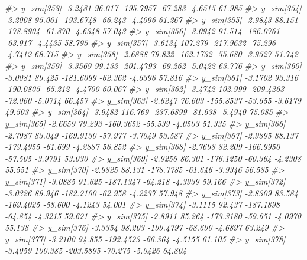 \documentclass[
  10pt,
  italian,
  a4paper,
  extrafontsizes,onecolumn,openright
  ]{memoir}
\newenvironment{Shaded}{\begin{snugshade}}{\end{snugshade}}
\newcommand{\CommentTok}[1]{\textcolor[rgb]{0.56,0.35,0.01}{\textit{#1}}}
\begin{document}
\begin{Shaded}
\begin{Highlighting}[]
\CommentTok{\#\textgreater{}   y\_sim[353] {-}3.2481  96.017 {-}195.7957 {-}67.283 {-}4.6515 61.985}
\CommentTok{\#\textgreater{}   y\_sim[354] {-}3.2008  95.061 {-}193.6748 {-}66.243 {-}4.4096 61.267}
\CommentTok{\#\textgreater{}   y\_sim[355] {-}2.9843  88.151 {-}178.8904 {-}61.870 {-}4.6348 57.043}
\CommentTok{\#\textgreater{}   y\_sim[356] {-}3.0942  91.514 {-}186.0761 {-}63.917 {-}4.4435 58.795}
\CommentTok{\#\textgreater{}   y\_sim[357] {-}3.6134 107.279 {-}217.9632 {-}75.296 {-}4.7412 68.715}
\CommentTok{\#\textgreater{}   y\_sim[358] {-}2.6888  79.822 {-}162.1732 {-}55.680 {-}3.9527 51.742}
\CommentTok{\#\textgreater{}   y\_sim[359] {-}3.3569  99.133 {-}201.4793 {-}69.262 {-}5.0422 63.776}
\CommentTok{\#\textgreater{}   y\_sim[360] {-}3.0081  89.425 {-}181.6099 {-}62.362 {-}4.6396 57.816}
\CommentTok{\#\textgreater{}   y\_sim[361] {-}3.1702  93.316 {-}190.0805 {-}65.212 {-}4.4700 60.067}
\CommentTok{\#\textgreater{}   y\_sim[362] {-}3.4742 102.999 {-}209.4263 {-}72.060 {-}5.0714 66.457}
\CommentTok{\#\textgreater{}   y\_sim[363] {-}2.6247  76.603 {-}155.8537 {-}53.655 {-}3.6179 49.503}
\CommentTok{\#\textgreater{}   y\_sim[364] {-}3.9482 116.769 {-}237.6899 {-}81.638 {-}5.4940 75.085}
\CommentTok{\#\textgreater{}   y\_sim[365] {-}2.6659  79.293 {-}160.3652 {-}55.539 {-}4.0503 51.335}
\CommentTok{\#\textgreater{}   y\_sim[366] {-}2.7987  83.049 {-}169.9130 {-}57.977 {-}3.7049 53.587}
\CommentTok{\#\textgreater{}   y\_sim[367] {-}2.9895  88.137 {-}179.4955 {-}61.699 {-}4.2887 56.852}
\CommentTok{\#\textgreater{}   y\_sim[368] {-}2.7698  82.209 {-}166.9950 {-}57.505 {-}3.9791 53.030}
\CommentTok{\#\textgreater{}   y\_sim[369] {-}2.9256  86.301 {-}176.1250 {-}60.364 {-}4.2308 55.551}
\CommentTok{\#\textgreater{}   y\_sim[370] {-}2.9825  88.131 {-}178.7785 {-}61.646 {-}3.9346 56.585}
\CommentTok{\#\textgreater{}   y\_sim[371] {-}3.0885  91.625 {-}187.1347 {-}64.218 {-}4.3939 59.166}
\CommentTok{\#\textgreater{}   y\_sim[372] {-}3.0326  89.946 {-}182.2100 {-}62.958 {-}4.2237 57.948}
\CommentTok{\#\textgreater{}   y\_sim[373] {-}2.8309  83.584 {-}169.4025 {-}58.600 {-}4.1243 54.001}
\CommentTok{\#\textgreater{}   y\_sim[374] {-}3.1115  92.437 {-}187.1898 {-}64.854 {-}4.3215 59.621}
\CommentTok{\#\textgreater{}   y\_sim[375] {-}2.8911  85.264 {-}173.3180 {-}59.651 {-}4.0970 55.138}
\CommentTok{\#\textgreater{}   y\_sim[376] {-}3.3354  98.203 {-}199.4797 {-}68.690 {-}4.6897 63.249}
\CommentTok{\#\textgreater{}   y\_sim[377] {-}3.2100  94.855 {-}192.4523 {-}66.364 {-}4.5155 61.105}
\CommentTok{\#\textgreater{}   y\_sim[378] {-}3.4059 100.385 {-}203.5895 {-}70.275 {-}5.0426 64.804}

\end{Highlighting}
\end{Shaded}
\end{document}
